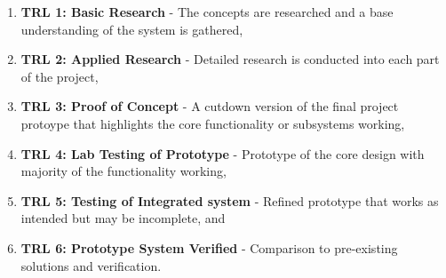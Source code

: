 \begin{enumerate}
    \item \textbf{TRL 1: Basic Research} - The concepts are researched and a base understanding of the system is gathered,
    \item \textbf{TRL 2: Applied Research} - Detailed research is conducted into each part of the project,
    \item \textbf{TRL 3: Proof of Concept} - A cutdown version of the final project protoype that highlights the core functionality or subsystems working,
    \item \textbf{TRL 4: Lab Testing of Prototype} - Prototype of the core design with majority of the functionality working,
    \item \textbf{TRL 5: Testing of Integrated system} - Refined prototype that works as intended but may be incomplete, and
    \item \textbf{TRL 6: Prototype System Verified} - Comparison to pre-existing solutions and verification. 
\end{enumerate}


